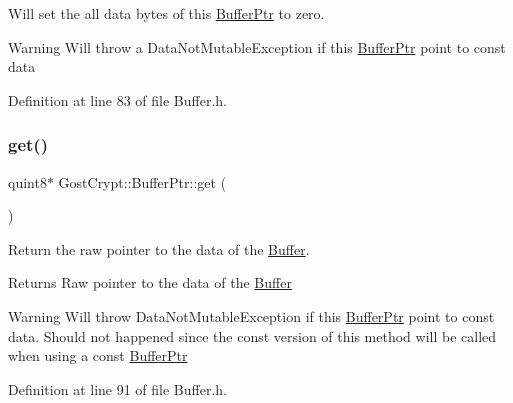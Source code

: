 Will set the all data bytes of this \hyperlink{class_gost_crypt_1_1_buffer_ptr}{Buffer\+Ptr} to zero. 

\begin{DoxyWarning}{Warning}
Will throw a Data\+Not\+Mutable\+Exception if this \hyperlink{class_gost_crypt_1_1_buffer_ptr}{Buffer\+Ptr} point to const data 
\end{DoxyWarning}


Definition at line 83 of file Buffer.\+h.

\mbox{\label{class_gost_crypt_1_1_buffer_ptr_af90ea689dd0dd362c7b0ea90b90c17ea}} 
\subsubsection{\texorpdfstring{get()}{get()}\hspace{0.1cm}{\footnotesize\ttfamily [1/2]}}
{\footnotesize\ttfamily quint8$\ast$ Gost\+Crypt\+::\+Buffer\+Ptr\+::get (\begin{DoxyParamCaption}{ }\end{DoxyParamCaption})\hspace{0.3cm}{\ttfamily [inline]}}



Return the raw pointer to the data of the \hyperlink{class_gost_crypt_1_1_buffer}{Buffer}. 

\begin{DoxyReturn}{Returns}
Raw pointer to the data of the \hyperlink{class_gost_crypt_1_1_buffer}{Buffer} 
\end{DoxyReturn}
\begin{DoxyWarning}{Warning}
Will throw Data\+Not\+Mutable\+Exception if this \hyperlink{class_gost_crypt_1_1_buffer_ptr}{Buffer\+Ptr} point to const data. Should not happened since the const version of this method will be called when using a const \hyperlink{class_gost_crypt_1_1_buffer_ptr}{Buffer\+Ptr} 
\end{DoxyWarning}


Definition at line 91 of file Buffer.\+h.

\mbox{\label{class_gost_crypt_1_1_buffer_ptr_a4cf47ef7551c41ce858a9f7df721e4ed}} 

